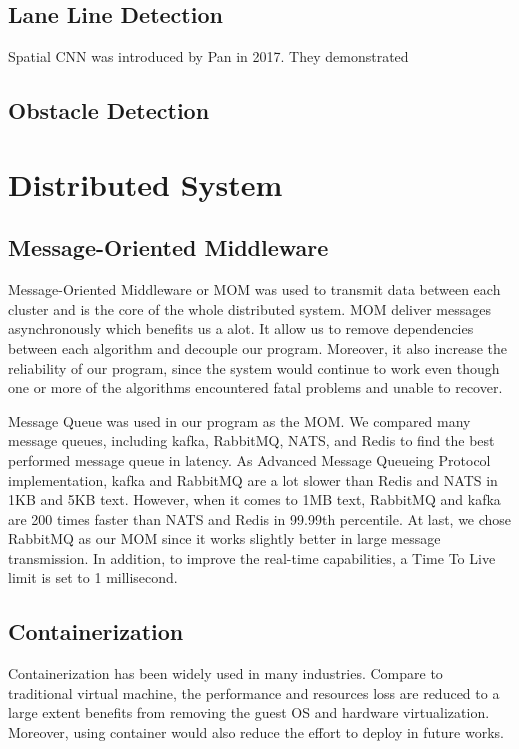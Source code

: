 \documentclass[runningheads]{llncs}
\begin{document}
\subsection{Lane Line Detection}

Spatial CNN was introduced by Pan in 2017. They 
demonstrated

\subsection{Obstacle Detection}


\section{Distributed System}

\subsection{Message-Oriented Middleware}
Message-Oriented Middleware or MOM was used to transmit 
data between each cluster and is the core of the whole 
distributed system. MOM deliver messages asynchronously 
which benefits us a alot. It allow us to remove 
dependencies between each algorithm and decouple our 
program. Moreover, it also increase the reliability of our 
program, since the system would continue to work even 
though one or more of the algorithms encountered fatal 
problems and unable to recover.

Message Queue was used in our program as the MOM. We 
compared many message queues, including kafka, RabbitMQ, 
NATS, and Redis to find the best performed message queue 
in latency. As Advanced Message Queueing Protocol 
implementation, kafka and RabbitMQ are a lot slower than 
Redis and NATS in 1KB and 5KB text. However, when it comes
to 1MB text, RabbitMQ and kafka are 200 times faster than 
NATS and Redis in 99.99th percentile. At last, we chose 
RabbitMQ as our MOM since it works slightly better in large 
message transmission. In addition, to improve the real-time 
capabilities, a Time To Live limit is set to 1 millisecond.


\subsection{Containerization}
Containerization has been widely used in many industries. 
Compare to traditional virtual machine, the performance 
and resources loss are reduced to a large extent benefits 
from removing the guest OS and hardware virtualization. 
Moreover, using container would also reduce the effort to 
deploy in future works. 
\end{document}
